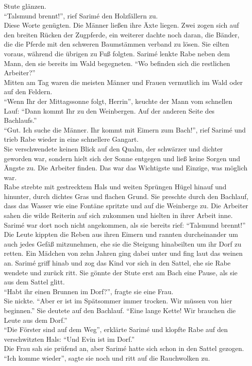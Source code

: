 Stute glänzen.\\
``Talsmund brennt!'', rief Sarimé den Holzfällern zu.\\
Diese Worte genügten. Die Männer ließen ihre Äxte liegen. Zwei zogen sich auf den breiten Rücken 
der Zugpferde, ein weiterer dachte noch daran, die Bänder, die die Pferde mit den schweren 
Baumstämmen verband zu lösen. Sie eilten voraus, während die übrigen zu Fuß folgten. Sarimé lenkte 
Rabe neben dem Mann, den sie bereits im Wald begegneten. ``Wo befinden sich die restlichen 
Arbeiter?''\\
Mitten am Tag waren die meisten Männer und Frauen vermutlich im Wald oder auf den Feldern.\\
``Wenn Ihr der Mittagssonne folgt, Herrin'', keuchte der Mann vom schnellen Lauf: ``Dann kommt Ihr 
zu den Weinbergen. Auf der anderen Seite des Bachlaufs.''\\
``Gut. Ich suche die Männer. Ihr kommt mit Eimern zum Bach!'', rief Sarimé und trieb Rabe wieder in 
eine schnellere Gangart.\\
Sie verschwendete keinen Blick auf den Qualm, der schwärzer und dichter geworden war, sondern hielt 
sich der Sonne entgegen und ließ keine Sorgen und Ängste zu. Die Arbeiter finden. Das war das 
Wichtigste und Einzige, was möglich war.\\
Rabe strebte mit gestrecktem Hals und weiten Sprüngen Hügel hinauf und hinunter, durch dichtes Gras 
und flachen Grund. Sie preschte durch den Bachlauf, dass das Wasser wie eine Fontäne spritzte und 
auf die Weinberge zu. Die Arbeiter sahen die wilde Reiterin auf sich zukommen und hielten in ihrer 
Arbeit inne.\\
Sarimé war dort noch nicht angekommen, als sie bereits rief: ``Talsmund brennt!''\\
Die Leute kippten die Reben aus ihren Eimern und rannten durcheinander um auch jedes Gefäß 
mitzunehmen, ehe sie die Steigung hinabeilten um ihr Dorf zu retten. Ein Mädchen von zehn Jahren 
ging dabei unter und fing laut das weinen an. Sarimé griff hinab und zog das Kind vor sich in den 
Sattel, ehe sie Rabe wendete und zurück ritt. Sie gönnte der Stute erst am Bach eine Pause, als sie 
aus dem Sattel glitt.\\
``Habt ihr einen Brunnen im Dorf?'', fragte sie eine Frau.\\
Sie nickte. ``Aber er ist im Spätsommer immer trocken. Wir müssen von hier beginnen.'' Sie deutete 
auf den Bachlauf. ``Eine lange Kette! Wir brauchen die Leute aus dem Dorf.''\\
``Die Förster sind auf dem Weg'', erklärte Sarimé und klopfte Rabe auf den verschwitzten Hals: 
``Und Evin ist im Dorf.''\\
Die Frau sah sie prüfend an, aber Sarimé hatte sich schon in den Sattel gezogen. ``Ich komme 
wieder'', sagte sie noch und ritt auf die Rauchwolken zu.\\

